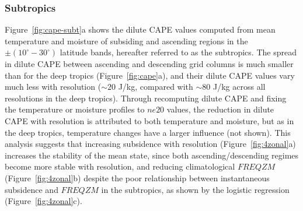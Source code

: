 \documentclass[alpha-refs]{wiley-article}
\begin{document}
\subsubsection{Subtropics}

Figure~\ref{fig:cape-subt}a shows the dilute CAPE values computed from mean temperature and moisture of subsiding and ascending regions in the $\pm \left( 10^{\circ}-30^{\circ} \right) $ latitude bands, hereafter referred to as the subtropics. The spread in dilute CAPE between ascending and descending grid columns is much smaller than for the deep tropics (Figure~\ref{fig:cape}a), and their dilute CAPE  values vary much less with resolution ($\sim 20$ J/kg, compared with $\sim 80$ J/kg across all resolutions in the deep tropics). Through recomputing dilute CAPE and fixing the temperature or moisture profiles to $ne20$ values, the reduction in dilute CAPE with resolution is attributed to both temperature and moisture, but as in the deep tropics, temperature changes have a larger influence (not shown). This analysis suggests that increasing subsidence with resolution (Figure~\ref{fig:4zonal}a) increases the stability of the mean state, since both ascending/descending regimes become more stable with resolution, and reducing climatological $FREQZM$ (Figure~\ref{fig:4zonal}b) despite the poor relationship between instantaneous subsidence and $FREQZM$ in the subtropics, as shown by the logistic regression (Figure~\ref{fig:4zonal}c).
\end{document}

